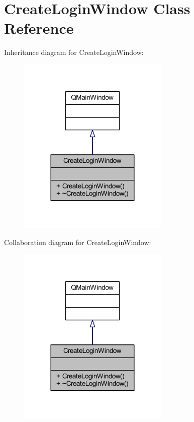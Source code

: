\hypertarget{class_create_login_window}{}\section{Create\+Login\+Window Class Reference}
\label{class_create_login_window}


Inheritance diagram for Create\+Login\+Window\+:\nopagebreak
\begin{figure}[H]
\begin{center}
\leavevmode
\includegraphics[width=204pt]{class_create_login_window__inherit__graph}
\end{center}
\end{figure}


Collaboration diagram for Create\+Login\+Window\+:\nopagebreak
\begin{figure}[H]
\begin{center}
\leavevmode
\includegraphics[width=204pt]{class_create_login_window__coll__graph}
\end{center}
\end{figure}
